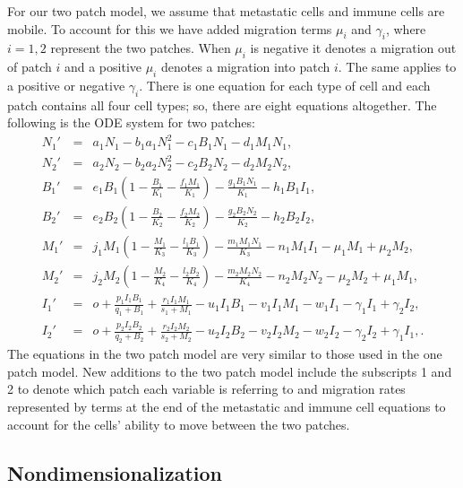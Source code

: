 \documentclass[letter,10pt]{article}
\begin{document}
For our two patch model, we assume that metastatic cells and immune cells are mobile. To account for this we have added migration terms $\mu_i$ and $\gamma_i$, where $i=1,2$ represent the two patches. When $\mu_i$ is negative it denotes a migration out of patch $i$ and a positive $\mu_i$ denotes a migration into patch $i$. The same applies to a positive or negative $\gamma_i$. There is one equation for each type of cell and each patch contains all four cell types; so, there are eight  equations altogether. The following is the ODE system for two patches:
\begin{eqnarray}
N_1' &=& a_1N_1-b_1a_1N_1^2-c_1B_1N_1-d_1M_1N_1,\label{normal1}\nonumber\\
N_2' &=&a_2N_2-b_2a_2N_2^2-c_2B_2N_2-d_2M_2N_2,\label{normal2}\nonumber\\
B_1' &=&e_1B_1(1-\frac{B_1}{K_1}-\frac{f_1M_1}{K_1})-\frac{g_1B_1N_1}{K_1}-h_1B_1I_1,\label{benign1}\nonumber\\
B_2' &=& e_2B_2(1-\frac{B_2}{K_2}-\frac{f_2M_2}{K_2})-\frac{g_2B_2N_2}{K_2}-h_2B_2I_2,\label{benign2}\nonumber\\
M_1' &=&j_1M_1(1-\frac{M_1}{K_3}-\frac{l_1B_1}{K_3})-\frac{m_1M_1N_1}{K_3}-n_1M_1I_1-\mu _1M_1+ \mu _2M_2,\label{metastatic1}\nonumber\\
M_2' &=& j _2M_2(1-\frac{M_2}{K_4}-\frac{l_2 B_2}{K_4})-\frac{m_2M_2N_2}{K_4}-n_2M_2N_2-\mu _2M_2+ \mu _1M_1,\label{metastatic2}\nonumber\\
I_1' &=& o+\frac{p _1I_1B_1}{q_1+B_1}+\frac{r_1I_1M_1}{s_1+M_1}-u_1I_1B_1-v_1I_1M_1-w_1I_1-\gamma _1I_1+\gamma _2I_2,\label{immune1}\nonumber\\
I_2' &=& o+\frac{p _2I_2B_2}{q_2+B_2}+\frac{r_2I_2M_2}{s_2+M_2}-u_2I_2B_2-v_2I_2M_2-w_2I_2-\gamma _2I_2+\gamma_1I_1,\label{immune2}.\nonumber
\end{eqnarray}
The equations in the two patch model are very similar to those used in the one patch model. New additions to the two patch model include the subscripts 1 and 2 to denote which patch each variable is referring to and migration rates represented by terms at the end of the metastatic and immune cell equations to account for the cells'  ability to move between the two patches.

\subsection{Nondimensionalization}
\end{document}
